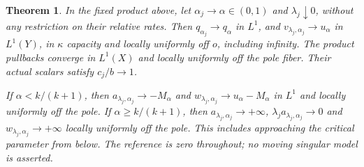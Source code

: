 \documentclass[11pt]{article}
\newtheorem{theorem}{Theorem}
\theoremstyle{remark}\newtheorem{remark}[theorem]{Remark}
\begin{document}
\begin{theorem}\label{thm:joint}
In the fixed product above, let $\alpha_j\to\alpha\in(0,1)$ and
$\lambda_j\downarrow0$, without any restriction on their relative rates.
Then $q_{\alpha_j}\to q_\alpha$ in $L^1$, and
$v_{\lambda_j,\alpha_j}\to u_\alpha$ in $L^1(Y)$, in $\kappa$ capacity
and locally uniformly off $o$, including infinity. The product pullbacks
converge in $L^1(X)$ and locally uniformly off the pole fiber.
Their actual scalars satisfy $c_j/b\to1$.

If $\alpha<k/(k+1)$, then $a_{\lambda_j,\alpha_j}\to-M_\alpha$ and
$w_{\lambda_j,\alpha_j}\to u_\alpha-M_\alpha$ in $L^1$ and locally
uniformly off the pole. If $\alpha\geq k/(k+1)$, then
$a_{\lambda_j,\alpha_j}\to+\infty$, $\lambda_j a_{\lambda_j,\alpha_j}\to0$
and $w_{\lambda_j,\alpha_j}\to+\infty$ locally uniformly off the pole.
This includes approaching the critical parameter from below.
The reference is zero throughout; no moving singular model is asserted.
\end{theorem}
\end{document}

